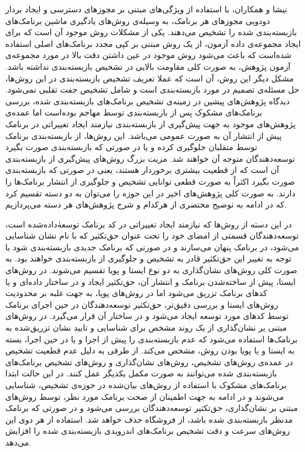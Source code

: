 نیشا و همکاران، با استفاده از ویژگی‌های مبتنی بر مجوز‌‌های دسترسی و ایجاد بردار دودویی مجوز‌های هر برنامک، به وسیله‌ی روش‌های یاد‌گیری ماشین برنامک‌های بازبسته‌بندی شده را تشخیص می‌دهند. یکی از مشکلات روش موجود آن است که برای ایجاد مجموعه‌ی داده آزمون، از یک روش مبتنی بر کپی مجدد برنامک‌های اصلی استفاده شده‌است که باعث می‌شود روش موجود در عین داشتن دقت بالا در مورد مجموعه‌ی آزمون پژوهش، به صورت کلی مقاومت بالایی در تشخیص بازبسته‌بندی نداشته باشد. مشکل دیگر این روش، آن است که عملا تعریف تشخیص بازبسته‌بندی در این روش‌ها، حل مسئله‌ی تصمیم در مورد بازبسته‌بندی است و شامل تشخیص جفت تقلبی نمی‌شود.
دیدگاه پژوهش‌های پیشین در زمینه‌ی تشخیص برنامک‌های بازبسته‌بندی شده، بررسی برنامک‌های مشکوک پس از بازبسته‌بندی توسط مهاجم بوده‌است اما
عمده‌ی پژوهش‌های موجود به جهت پیش‌گیری از بازبسته‌بندی نیازمند ایجاد تغییراتی در برنامک پیش از انتشار آن به صورت عمومی می‌باشد. این روش‌ها، از بازبسته‌بندی برنامک توسط متقلبان جلوگیری کرده و یا در صورتی که بازبسته‌بندی صورت بگیرد توسعه‌دهندگان متوجه آن خواهند‌ شد. مزیت بزرگ روش‌های پیش‌گیری از بازبسته‌بندی آن‌ است که از قطعیت بیشتری برخوردار هستند، یعنی در صورتی که بازبسته‌بندی صورت بگیرد اکثراً به صورت قطعی توانایی تشخیص و جلوگیری از انتشار برنامک‌ها را دارند. به صورت کلی پژوهش‌های اخیر در این حوزه را می‌توان به دو دسته تقسیم کرد که در ادامه به توضیح مختصری از هر‌کدام و شرح پژوهش‌های هر دسته می‌پردازیم.



در این دسته از روش‌ها که نیازمند ایجاد تغییراتی در کد برنامک توسعه‌ٰداده‌شده است، توسعه‌دهندگان قسمتی از امضا‌ی خود را تحت عنوان حق‌تکثیر‌ که با نام نشان شناسایی می‌شود، در برنامک پنهان می‌سازند و در صورتی که برنامک‌ جدیدی بازبسته‌بندی شود با توجه به تغییر این حق‌تکثیر قادر به تشخیص و جلوگیری از بازبسته‌بندی خواهند بود. به صورت کلی روش‌های نشان‌گذاری‌ به دو نوع ایستا و پویا تقسیم می‌شوند. در روش‌های ایستا، پیش از ساخته‌‌شدن برنامک و انتشار آن، حق‌تکثیر ایجاد و در ساختار داده‌ای و یا کد‌های برنامک تزریق می‌شود اما در روش‌های پویا، به جهت غلبه بر محدودیت روش‌های ایستا و بررسی دقیق‌تر،‌ حق‌تکثیر توسعه‌دهندگان در حین اجرای برنامک توسط کد‌های مورد توسعه ایجاد می‌شود و در ساختار آن قرار می‌گیرد. در روش‌های مبتنی بر نشان‌گذاری از یک روند مشخص برای شناسایی و تایید نشان تزریق‌شده به برنامک‌ها استفاده می‌شود که عدم بازبسته‌بندی را پیش از اجرا و یا در حین اجرا، بسته به ایستا و یا پویا بودن روش، مشخص می‌کند. از طرفی به دلیل عدم قطعیت تشخیص در عمده‌ی روش‌های تشخیص، روش‌های نشان‌گذاری و روش‌های تشخیص برنامک‌‌های بازبسته‌بندی شده می‌توانند به صورت مکمل یکدیگر عمل کنند.  در این حالت ابتدا برنامک‌های مشکوک با استفاده از روش‌های بیان‌شده در حوزه‌ی تشخیص، شناسایی می‌شوند و در ادامه به جهت اطمینان از صحت برنامک مورد نظر، توسط روش‌های مبتنی بر نشان‌گذاری، حق‌تکثیر توسعه‌دهندگان بررسی می‌شود و در صورتی که برنامک مدنظر بازبسته‌بندی شده باشد، از فروشگاه حذف خواهد شد. استفاده از هر دوی این روش‌های سرعت و دقت تشخیص برنامک‌های اندرویدی بازبسته‌بندی شده را افزایش می‌دهد.

